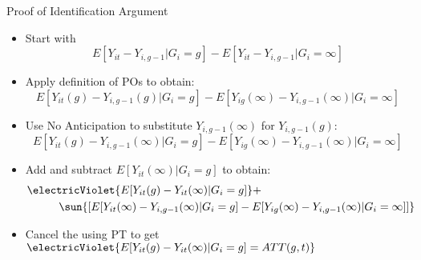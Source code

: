 \documentclass[aspectratio = 169, 13pt]{beamer}
\begin{document}
\begin{frame}{Proof of Identification Argument}
	\begin{itemize}
		\item
		Start with
		\vspace{-3mm}
		$$E[Y_{it}- Y_{i,g-1}| G_i =g] - E[Y_{it} - Y_{i,g-1}| G_i = \infty]$$
		
		\pause
		\vspace{-3mm}
		\item
		Apply definition of POs to obtain:
		\vspace{-3mm}
		$$E[Y_{it}(g) - Y_{i,g-1}(g) | G_i =g] - E[Y_{ig}(\infty) - Y_{i,g-1}(\infty) | G_i = \infty]$$
		
		\pause
		\vspace{-3mm}
		\item
		Use No Anticipation to substitute $Y_{i,g-1}(\infty)$ for $Y_{i,g-1}(g)$:
		\vspace{-3mm}
		$$E[Y_{it}(g) - Y_{i,g-1}(\infty) | G_i =g] - E[Y_{ig}(\infty) - Y_{i,g-1}(\infty) | G_i = \infty]$$
		
		
		\pause
		\vspace{-3mm}
		\item
		Add and subtract $E[ Y_{it}(\infty) | G_i =g] $ to obtain:
		\begin{align*}
			& \electricViolet{E[ Y_{it}(g) - Y_{it}(\infty) | G_i =g]} +                                                                                           \\
			& \hspace{1cm} \sun{\left[ E[Y_{it}(\infty) - Y_{i,g-1}(\infty) | G_i =g] - E[Y_{ig}(\infty) - Y_{i,g-1}(\infty) | G_i = \infty] \right]}
		\end{align*}
		
		\pause
		\vspace{-3mm}
		\item
		Cancel the  using PT to get $\electricViolet{E[Y_{it}(g) - Y_{it}(\infty) | G_i = g] = ATT(g,t)}$
	\end{itemize}
	
	
\end{frame}
\end{document}
